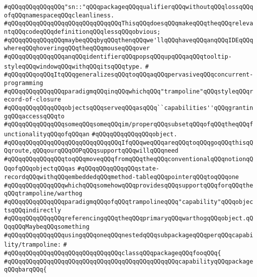 \verb|#qQQqqQQqqQQqqQQq"sn::"qQQqpackageqQQqqualifierqQQqwithoutqQQqlossqQQqofqQQqnamespaceqQQqcleanliness.|\newline
\verb|#qQQqqQQqqQQqqQQqqQQqqQQqqQQqqQQqThisqQQqdoesqQQqmakeqQQqtheqQQqrelevantqQQqcodeqQQqdefinitionqQQqlessqQQqobvious;|\newline
\verb|#qQQqqQQqqQQqqQQqmaybeqQQqbyqQQqthenqQQqwe'llqQQqhaveqQQqanqQQqIDEqQQqwhereqQQqhoveringqQQqtheqQQqmouseqQQqover|\newline
\verb|#qQQqqQQqqQQqqQQqanqQQqidentifierqQQqpopsqQQqupqQQqaqQQqtooltip-styleqQQqwindowqQQqwithqQQqitsqQQqtype.|\newline
\verb|#|\newline
\verb|#qQQqqQQqoqQQqItqQQqgeneralizesqQQqtoqQQqaqQQqpervasiveqQQqconcurrent-programming|\newline
\verb|#qQQqqQQqqQQqqQQqparadigmqQQqinqQQqwhichqQQq"trampoline"qQQqstyleqQQqrecord-of-closure|\newline
\verb|#qQQqqQQqqQQqqQQqobjectsqQQqserveqQQqasqQQq``capabilities''qQQqgrantingqQQqaccessqQQqto|\newline
\verb|#qQQqqQQqqQQqqQQqsomeqQQqsomeqQQqim/properqQQqsubsetqQQqofqQQqtheqQQqfunctionalityqQQqofqQQqan|\newline
\verb|#qQQqqQQqqQQqqQQqobject.|\newline
\verb|#qQQqqQQqqQQqqQQqqQQqqQQqqQQqqQQqIfqQQqweqQQqareqQQqtoqQQqgoqQQqthisqQQqroute,qQQqourqQQqOOPqQQqsupportqQQqwillqQQqneed|\newline
\verb|#qQQqqQQqqQQqqQQqtoqQQqmoveqQQqfromqQQqtheqQQqconventionalqQQqnotionqQQqofqQQqobjectqQQqas|\newline
\verb|#qQQqqQQqqQQqqQQqstate-recordqQQqwithqQQqembeddedqQQqmethod-tableqQQqpointerqQQqtoqQQqone|\newline
\verb|#qQQqqQQqqQQqqQQqwhichqQQqsomehowqQQqprovidesqQQqsupportqQQqforqQQqtheqQQqtrampoline/warthog|\newline
\verb|#qQQqqQQqqQQqqQQqparadigmqQQqofqQQqtrampolineqQQq"capability"qQQqobjectsqQQqindirectly|\newline
\verb|#qQQqqQQqqQQqqQQqreferencingqQQqtheqQQqprimaryqQQqwarthogqQQqobject.qQQqqQQqMaybeqQQqsomething|\newline
\verb|#qQQqqQQqqQQqqQQqusingqQQqoneqQQqnestedqQQqsubpackageqQQqperqQQqcapability/trampoline:|\newline
\verb|#|\newline
\verb|#qQQqqQQqqQQqqQQqqQQqqQQqqQQqqQQqclassqQQqpackageqQQqfooqQQq{|\newline
\verb|#qQQqqQQqqQQqqQQqqQQqqQQqqQQqqQQqqQQqqQQqqQQqqQQqcapabilityqQQqpackageqQQqbarqQQq{|\newline
